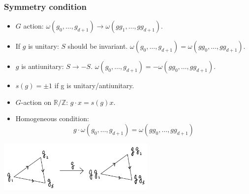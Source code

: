 \documentclass[xcolor=table, aspectratio=169,ignorenonframetext]{beamer}
\begin{document}
\begin{frame}
\frametitle{Symmetry condition}

\begin{itemize}
\item $G$ action:
$\omega(g_0, \ldots, g_{d+1})\rightarrow \omega(gg_1, \ldots, gg_{d+1})$.
\item If $g$ is unitary: $S$ should be invariant. $\omega(g_0, \ldots, g_{d+1})= \omega(gg_0, \ldots, gg_{d+1})$.

\item $g$ is antiunitary: $S\rightarrow -S$. $\omega(g_0, \ldots, g_{d+1})= -\omega(gg_0, \ldots, gg_{d+1})$.
\item $s(g)=\pm1$ if g is unitary/antiunitary.
\item $G$-action on $\mathbb R/\mathbb Z$:
$g\cdot x=s(g)x$.
\item Homogeneous condition:
\[g\cdot\omega(g_0, \ldots, g_{d+1})= \omega(gg_0, \ldots, gg_{d+1})\]
\end{itemize}

\begin{center}
\includegraphics[height=2.5cm]{tri-action}
\end{center}
\end{frame}
\end{document}
